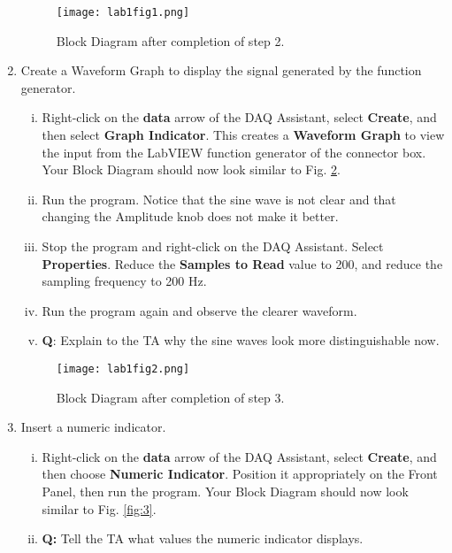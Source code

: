 \documentclass[12pt]{article}
\begin{document}
\begin{enumerate}[1.]
	\begin{figure}[!h]
	\begin{center}
	\texttt{[image: lab1fig1.png]}
	\caption{Block Diagram after completion of step 2.}
	\label{fig:1}
	\end{center}
	\end{figure}
	
	\item Create a Waveform Graph to display the signal generated by the function generator.
	\begin{enumerate}[i.] 
		\item Right-click on the \textbf{data} arrow of the DAQ Assistant, select \textbf{Create}, and then select
\textbf{Graph Indicator}. This creates a \textbf{Waveform Graph} to view the input from the LabVIEW function generator of the connector box. Your Block Diagram should now look similar to Fig. \ref{fig:2}.
		\item Run the program. Notice that the sine wave is not clear and that changing the Amplitude knob does not make it better.
		\item Stop the program and right-click on the DAQ Assistant. Select \textbf{Properties}. Reduce
the \textbf{Samples to Read} value to 200, and reduce the sampling frequency to 200 Hz.
		\item Run the program again and observe the clearer waveform.
		\item \textbf{Q}: Explain to the TA why the sine waves look more distinguishable now.
	\end{enumerate}
	
	\begin{figure}[!ht]
	\begin{center}
	\texttt{[image: lab1fig2.png]}
	\caption{Block Diagram after completion of step 3.}
	\label{fig:2}
	\end{center}
	\end{figure}
	
	\item Insert a numeric indicator.
	\begin{enumerate}[i.]
		\item Right-click on the \textbf{data} arrow of the DAQ Assistant, select {\bf Create}, and then choose
{\bf Numeric Indicator}. Position it appropriately on the Front Panel, then run the program. Your Block Diagram should now look similar to Fig. \ref{fig:3}.
		\item \textbf{Q:} Tell the TA what values the numeric indicator displays.
	\end{enumerate}
	

\end{enumerate}
\end{document}
